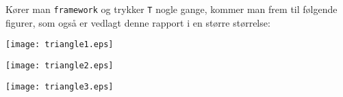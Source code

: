 \documentclass[a4paper, 10pt]{article}
\begin{document}
Kører man \texttt{framework} og trykker \texttt{T} nogle gange, kommer man frem til følgende figurer, som også er vedlagt denne rapport i en større størrelse:

\begin{center}
\centering
\texttt{[image: triangle1.eps]}
\end{center}

\begin{center}
\centering
\texttt{[image: triangle2.eps]}
\end{center}

\begin{center}
\centering
\texttt{[image: triangle3.eps]}
\end{center}
\end{document}
